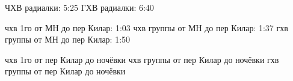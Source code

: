 














ЧХВ радиалки: 5:25
ГХВ радиалки: 6:40

чхв 1го от МН до пер Килар: 1:03
чхв группы от МН до пер Килар: 1:37
гхв группы от МН до пер Килар: 1:50

чхв 1го от пер Килар до ночёвки
чхв группы от пер Килар до ночёвки
гхв группы от пер Килар до ночёвки

    \FloatBarrier
